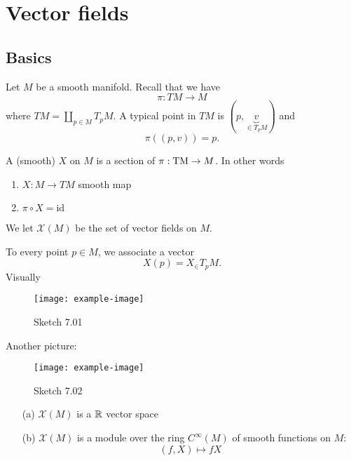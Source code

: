 \chapter{Vector fields}

\section{Basics}

Let \(M\) be a smooth manifold. Recall  that we have 
\[\pi: TM \to M\]
where \(TM=\coprod_{p\in M} T_p M\). A typical point in \(TM\) is \((p,\underbrace{v}_{\in T_pM})\) and 
\[\pi((p,v))=p.\]

\begin{definition*}
    A (smooth)  \(X\) on \(M\) is a 
    section of \(\pi:{\text{TM}}\to M\). In other words 
    \begin{enumerate}
        \item \(X:M\to TM\) smooth map 
        \item \(\pi\circ X=\text{id}\)
    \end{enumerate} 
    We let \(\mathcal{X}(M)\) be the set of vector fields on \(M\).
\end{definition*}

 To every point \(p\in M\), we associate a vector \[X(p)=X_\in T_pM.\]
Visually
\begin{figure}[H]\label{fig:7.01}
    \centering
    \texttt{[image: example-image]}
    \caption{Sketch 7.01}
\end{figure}

Another picture:

\begin{figure}[H]\label{fig:7.02}
    \centering
    \texttt{[image: example-image]}
    \caption{Sketch 7.02}
\end{figure}

\begin{lemma}\label{lem:7.1}
    \begin{enumerate} Let \(M\) be a smooth manifold.
        \item[(a)] \(\mathcal{X}(M)\) is a \(\mathbb{R}\) vector space 
        \item[(b)] \(\mathcal{X}(M)\) is a module over the ring \(C^{\infty}(M)\) of smooth functions on \(M\):
        \[(f,X)\mapsto fX\] 
    \end{enumerate}
\end{lemma}

